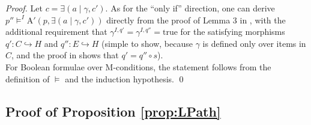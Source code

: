 \documentclass{llncs}
\begin{document}
\begin{proof}
		Let $c = \exists(a \mid \gamma, c')$. As for the ``only if'' direction, one can derive $p'' \models^I \text{A}'(p,\exists(a\mid \gamma,c'))$ directly from the proof of Lemma 3 in \cite{Habel-Pennemann09a}, with the additional requirement that $\gamma^{I,q'} = \gamma^{I,q''} = \text{true}$ for the satisfying morphisms $q'\!:C\hookrightarrow H$ and $q''\!:E\hookrightarrow H$ (simple to show, because $\gamma$ is defined only over items in $C$, and the proof in \cite{Habel-Pennemann09a} shows that $q' = q'' \circ s$).\\

		For Boolean formulae over M-conditions, the statement follows from the definition of $\models$ and the induction hypothesis.
		\qed
	\end{proof}
	
	
	
	
	
	
	\newpage\subsection{Proof of Proposition \ref{prop:LPath}}\label{prop:LPath:PROOF}
	
\end{document}
